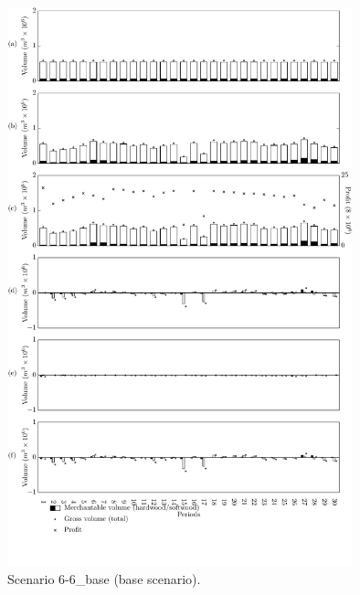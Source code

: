 \begin{figure}[h]
  \centering
  \includegraphics[width=10cm]{images/appendix/s6-6_base}
  \caption{Scenario 6-6\_base (base scenario).}
  \label{fig:s6-6_base}
\end{figure}

